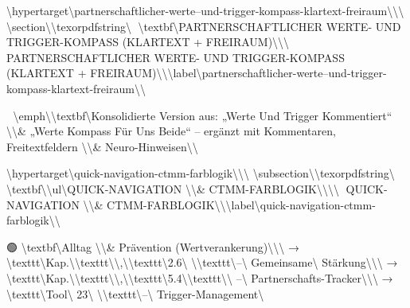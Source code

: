 \textbackslash{}hypertarget\textbackslash{}{partnerschaftlicher-werte--und-trigger-kompass-klartext-freiraum\textbackslash{}}\textbackslash{}{\textbackslash{}%
\textbackslash{}section\textbackslash{}{\textbackslash{}texorpdfstring\textbackslash{}{💞 \textbackslash{}textbf\textbackslash{}{PARTNERSCHAFTLICHER WERTE- UND TRIGGER-KOMPASS (KLARTEXT + FREIRAUM)\textbackslash{}}\textbackslash{}}\textbackslash{}{💞 PARTNERSCHAFTLICHER WERTE- UND TRIGGER-KOMPASS (KLARTEXT + FREIRAUM)\textbackslash{}}\textbackslash{}}\textbackslash{}label\textbackslash{}{partnerschaftlicher-werte--und-trigger-kompass-klartext-freiraum\textbackslash{}}\textbackslash{}}

🧩 \textbackslash{}emph\textbackslash{}{\textbackslash{}textbf\textbackslash{}{Konsolidierte Version aus: „Werte Und Trigger Kommentiert`` \textbackslash{}\textbackslash{}& „Werte Kompass Für Uns Beide`` -- ergänzt mit Kommentaren, Freitextfeldern \textbackslash{}\textbackslash{}& Neuro-Hinweisen\textbackslash{}}\textbackslash{}}

\textbackslash{}hypertarget\textbackslash{}{quick-navigation-ctmm-farblogik\textbackslash{}}\textbackslash{}{\textbackslash{}%
\textbackslash{}subsection\textbackslash{}{\textbackslash{}texorpdfstring\textbackslash{}{🔗 \textbackslash{}textbf\textbackslash{}{\textbackslash{}ul\textbackslash{}{QUICK-NAVIGATION \textbackslash{}\textbackslash{}& CTMM-FARBLOGIK\textbackslash{}}\textbackslash{}}\textbackslash{}}\textbackslash{}{🔗 QUICK-NAVIGATION \textbackslash{}\textbackslash{}& CTMM-FARBLOGIK\textbackslash{}}\textbackslash{}}\textbackslash{}label\textbackslash{}{quick-navigation-ctmm-farblogik\textbackslash{}}\textbackslash{}}

🟢 \textbackslash{}textbf\textbackslash{}{Alltag \textbackslash{}\textbackslash{}& Prävention (Wertverankerung)\textbackslash{}}\textbackslash{}\textbackslash{}
→ \textbackslash{}texttt\textbackslash{}{Kap.\textbackslash{}}\textbackslash{}texttt\textbackslash{}{\textbackslash{},\textbackslash{}}\textbackslash{}texttt\textbackslash{}{2.6\textbackslash{} \textbackslash{}}\textbackslash{}texttt\textbackslash{}{–\textbackslash{} Gemeinsame\textbackslash{} Stärkung\textbackslash{}}\textbackslash{}\textbackslash{}
→ \textbackslash{}texttt\textbackslash{}{Kap.\textbackslash{}}\textbackslash{}texttt\textbackslash{}{\textbackslash{},\textbackslash{}}\textbackslash{}texttt\textbackslash{}{5.4\textbackslash{}}\textbackslash{}texttt\textbackslash{}{\textbackslash{} –\textbackslash{} Partnerschafts-Tracker\textbackslash{}}\textbackslash{}\textbackslash{}
→ \textbackslash{}texttt\textbackslash{}{Tool\textbackslash{} 23\textbackslash{} \textbackslash{}}\textbackslash{}texttt\textbackslash{}{–\textbackslash{} Trigger-Management\textbackslash{}}

